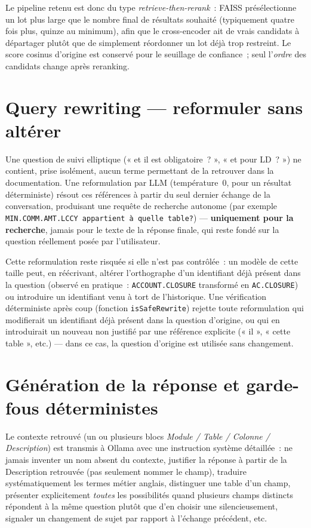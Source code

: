 ﻿\documentclass[12pt,a4paper]{report}
\newcommand{\code}[1]{\texttt{\color{biatbluedk}#1}}
\begin{document}
Le pipeline retenu est donc du type \emph{retrieve-then-rerank}~: FAISS présélectionne un lot plus large que le nombre final de résultats souhaité (typiquement quatre fois plus, quinze au minimum), afin que le cross-encoder ait de vrais candidats à départager plutôt que de simplement réordonner un lot déjà trop restreint. Le score cosinus d'origine est conservé pour le seuillage de confiance~; seul l'\emph{ordre} des candidats change après reranking.

\section{Query rewriting --- reformuler sans altérer}
Une question de suivi elliptique (« et il est obligatoire~? », « et pour LD~? ») ne contient, prise isolément, aucun terme permettant de la retrouver dans la documentation. Une reformulation par LLM (température~0, pour un résultat déterministe) résout ces références à partir du seul dernier échange de la conversation, produisant une requête de recherche autonome (par exemple \code{MIN.COMM.AMT.LCCY appartient à quelle table?}) --- \textbf{uniquement pour la recherche}, jamais pour le texte de la réponse finale, qui reste fondé sur la question réellement posée par l'utilisateur.

Cette reformulation reste risquée si elle n'est pas contrôlée~: un modèle de cette taille peut, en réécrivant, altérer l'orthographe d'un identifiant déjà présent dans la question (observé en pratique~: \code{ACCOUNT.CLOSURE} transformé en \code{AC.CLOSURE}) ou introduire un identifiant venu à tort de l'historique. Une vérification déterministe après coup (fonction \code{isSafeRewrite}) rejette toute reformulation qui modifierait un identifiant déjà présent dans la question d'origine, ou qui en introduirait un nouveau non justifié par une référence explicite (« il », « cette table », etc.) --- dans ce cas, la question d'origine est utilisée sans changement.

\section{Génération de la réponse et garde-fous déterministes}
Le contexte retrouvé (un ou plusieurs blocs \emph{Module / Table / Colonne / Description}) est transmis à Ollama avec une instruction système détaillée~: ne jamais inventer un nom absent du contexte, justifier la réponse à partir de la Description retrouvée (pas seulement nommer le champ), traduire systématiquement les termes métier anglais, distinguer une table d'un champ, présenter explicitement \emph{toutes} les possibilités quand plusieurs champs distincts répondent à la même question plutôt que d'en choisir une silencieusement, signaler un changement de sujet par rapport à l'échange précédent, etc.
\end{document}
